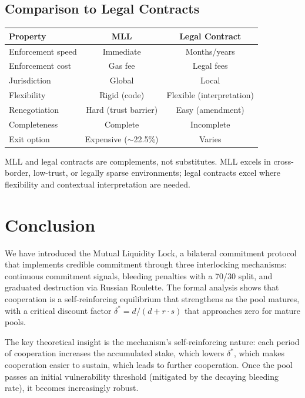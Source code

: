 \documentclass[12pt,a4paper]{article}
\begin{document}
\subsection{Comparison to Legal Contracts}

\begin{center}
\begin{tabular}{lcc}
\toprule
\textbf{Property} & \textbf{MLL} & \textbf{Legal Contract} \\
\midrule
Enforcement speed & Immediate & Months/years \\
Enforcement cost & Gas fee & Legal fees \\
Jurisdiction & Global & Local \\
Flexibility & Rigid (code) & Flexible (interpretation) \\
Renegotiation & Hard (trust barrier) & Easy (amendment) \\
Completeness & Complete & Incomplete \\
Exit option & Expensive ($\sim$22.5\%) & Varies \\
\bottomrule
\end{tabular}
\end{center}

MLL and legal contracts are complements, not substitutes. MLL excels in cross-border, low-trust, or legally sparse environments; legal contracts excel where flexibility and contextual interpretation are needed.



\section{Conclusion}
\label{sec:conclusion}

We have introduced the Mutual Liquidity Lock, a bilateral commitment protocol that implements credible commitment through three interlocking mechanisms: continuous commitment signals, bleeding penalties with a 70/30 split, and graduated destruction via Russian Roulette. The formal analysis shows that cooperation is a self-reinforcing equilibrium that strengthens as the pool matures, with a critical discount factor $\delta^* = d/(d + r \cdot s)$ that approaches zero for mature pools.

The key theoretical insight is the mechanism's self-reinforcing nature: each period of cooperation increases the accumulated stake, which lowers $\delta^*$, which makes cooperation easier to sustain, which leads to further cooperation. Once the pool passes an initial vulnerability threshold (mitigated by the decaying bleeding rate), it becomes increasingly robust.
\end{document}

